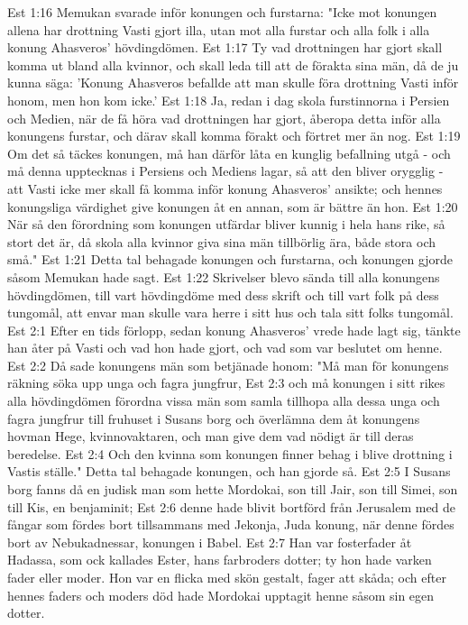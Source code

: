 Est 1:16  Memukan svarade inför konungen och furstarna: "Icke mot konungen allena har drottning Vasti gjort illa, utan mot alla furstar och alla folk i alla konung Ahasveros' hövdingdömen.
Est 1:17  Ty vad drottningen har gjort skall komma ut bland alla kvinnor, och skall leda till att de förakta sina män, då de ju kunna säga: 'Konung Ahasveros befallde att man skulle föra drottning Vasti inför honom, men hon kom icke.'
Est 1:18  Ja, redan i dag skola furstinnorna i Persien och Medien, när de få höra vad drottningen har gjort, åberopa detta inför alla konungens furstar, och därav skall komma förakt och förtret mer än nog.
Est 1:19  Om det så täckes konungen, må han därför låta en kunglig befallning utgå - och må denna upptecknas i Persiens och Mediens lagar, så att den bliver orygglig - att Vasti icke mer skall få komma inför konung Ahasveros' ansikte; och hennes konungsliga värdighet give konungen åt en annan, som är bättre än hon.
Est 1:20  När så den förordning som konungen utfärdar bliver kunnig i hela hans rike, så stort det är, då skola alla kvinnor giva sina män tillbörlig ära, både stora och små."
Est 1:21  Detta tal behagade konungen och furstarna, och konungen gjorde såsom Memukan hade sagt.
Est 1:22  Skrivelser blevo sända till alla konungens hövdingdömen, till vart hövdingdöme med dess skrift och till vart folk på dess tungomål, att envar man skulle vara herre i sitt hus och tala sitt folks tungomål.
Est 2:1  Efter en tids förlopp, sedan konung Ahasveros' vrede hade lagt sig, tänkte han åter på Vasti och vad hon hade gjort, och vad som var beslutet om henne.
Est 2:2  Då sade konungens män som betjänade honom: "Må man för konungens räkning söka upp unga och fagra jungfrur,
Est 2:3  och må konungen i sitt rikes alla hövdingdömen förordna vissa män som samla tillhopa alla dessa unga och fagra jungfrur till fruhuset i Susans borg och överlämna dem åt konungens hovman Hege, kvinnovaktaren, och man give dem vad nödigt är till deras beredelse.
Est 2:4  Och den kvinna som konungen finner behag i blive drottning i Vastis ställe." Detta tal behagade konungen, och han gjorde så.
Est 2:5  I Susans borg fanns då en judisk man som hette Mordokai, son till Jair, son till Simei, son till Kis, en benjaminit;
Est 2:6  denne hade blivit bortförd från Jerusalem med de fångar som fördes bort tillsammans med Jekonja, Juda konung, när denne fördes bort av Nebukadnessar, konungen i Babel.
Est 2:7  Han var fosterfader åt Hadassa, som ock kallades Ester, hans farbroders dotter; ty hon hade varken fader eller moder. Hon var en flicka med skön gestalt, fager att skåda; och efter hennes faders och moders död hade Mordokai upptagit henne såsom sin egen dotter.
